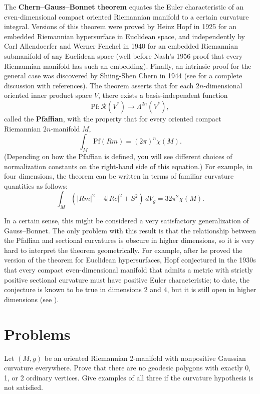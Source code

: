 The \textbf{Chern--Gauss--Bonnet theorem} equates the Euler characteristic of an even-dimensional compact oriented Riemannian manifold to a certain curvature integral. Versions of this theorem were proved by Heinz Hopf in 1925 for an embedded Riemannian hypersurface in Euclidean space, and independently by Carl Allendoerfer and Werner Fenchel in 1940 for an embedded Riemannian submanifold of any Euclidean space (well before Nash's 1956 proof that every Riemannian manifold has such an embedding). Finally, an intrinsic proof for the general case was discovered by Shiing-Shen Chern in 1944 (see \cite[Vol. 5]{Spi79} for a complete discussion with references). The theorem asserts that for each $2n$-dimensional oriented inner product space $V$, there exists a basis-independent function
\[
\text{Pf}: \mathcal{R}(V^*) \to \Lambda^{2n}(V^*),
\]
called the \textbf{Pfaffian}, with the property that for every oriented compact Riemannian $2n$-manifold $M$,
\[
\int_M \text{Pf}(Rm) = (2\pi)^n \chi(M).
\]
(Depending on how the Pfaffian is defined, you will see different choices of normalization constants on the right-hand side of this equation.) For example, in four dimensions, the theorem can be written in terms of familiar curvature quantities as follows:
\begin{equation}
\int_M (|Rm|^2 - 4|Rc|^2 + S^2) \, dV_g = 32\pi^2 \chi(M).
\label{eq:chern-gauss-bonnet-4d}
\tag{9.14}
\end{equation}

In a certain sense, this might be considered a very satisfactory generalization of Gauss--Bonnet. The only problem with this result is that the relationship between the Pfaffian and sectional curvatures is obscure in higher dimensions, so it is very hard to interpret the theorem geometrically. For example, after he proved the version of the theorem for Euclidean hypersurfaces, Hopf conjectured in the 1930s that every compact even-dimensional manifold that admits a metric with strictly positive sectional curvature must have positive Euler characteristic; to date, the conjecture is known to be true in dimensions 2 and 4, but it is still open in higher dimensions (see \cite[p. 320]{Pet16}).

\section{Problems}

\begin{exercise}
\label{prob:geodesic-polygons-negative-curvature}
Let $(M, g)$ be an oriented Riemannian 2-manifold with nonpositive Gaussian curvature everywhere. Prove that there are no geodesic polygons with exactly 0, 1, or 2 ordinary vertices. Give examples of all three if the curvature hypothesis is not satisfied.
\end{exercise}


